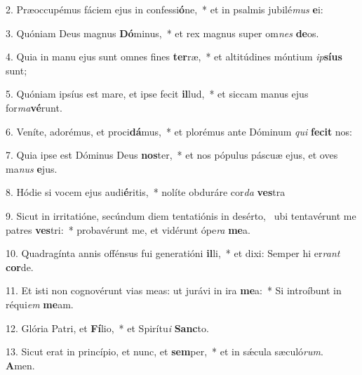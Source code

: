 2. Præoccupémus fáciem ejus in confessi\textbf{ó}ne,~*  et in psalmis jubilé\textit{mus} \textbf{e}i:\

3. Quóniam Deus magnus \textbf{Dó}minus,~*  et rex magnus super om\textit{nes} \textbf{de}os.\

4. Quia in manu ejus sunt omnes fines \textbf{ter}ræ,~*  et altitúdines móntium \textit{ip}\textbf{sí}\textbf{us} sunt;\

5. Quóniam ipsíus est mare, et ipse fecit \textbf{il}lud,~*  et siccam manus ejus for\textit{ma}\textbf{vé}runt.\

6. Veníte, adorémus, et proci\textbf{dá}mus,~*  et plorémus ante Dóminum \textit{qui} \textbf{fe}\textbf{cit} nos:\

7. Quia ipse est Dóminus Deus \textbf{nos}ter,~*  et nos pópulus páscuæ ejus, et oves ma\textit{nus} \textbf{e}jus.\

8. Hódie si vocem ejus audi\textbf{é}ritis,~*  nolíte obduráre cor\textit{da} \textbf{ves}tra\

9. Sicut in irritatióne, secúndum diem tentatiónis in desérto, \dag\  ubi tentavérunt me patres \textbf{ves}tri:~*  probavérunt me, et vidérunt ópe\textit{ra} \textbf{me}a.\

10. Quadragínta annis offénsus fui generatióni \textbf{il}li,~*  et dixi: Semper hi er\textit{rant} \textbf{cor}de.\

11. Et isti non cognovérunt vias meas: ut jurávi in ira \textbf{me}a:~*  Si introíbunt in réqui\textit{em} \textbf{me}am.\

12. Glória Patri, et \textbf{Fí}lio,~*  et Spirítu\textit{i} \textbf{Sanc}to.\

13. Sicut erat in princípio, et nunc, et \textbf{sem}per,~*  et in sǽcula sæculó\textit{rum}. \textbf{A}men.\


